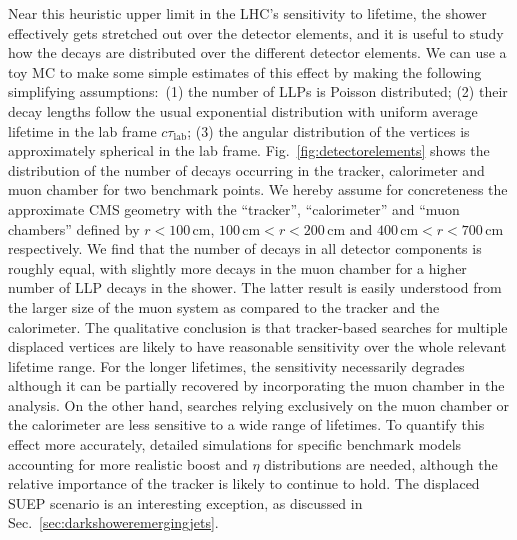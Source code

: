 Near this heuristic upper limit in the LHC's sensitivity to lifetime, the shower effectively gets stretched out over the detector elements, and it is useful to study how the decays are distributed over the different detector elements. We can use a toy MC to make some simple estimates of this effect by making the following simplifying assumptions:~(1) the number of LLPs is Poisson distributed; (2) their decay lengths follow the usual exponential distribution with uniform average lifetime in the lab frame $c\tau_{\text{lab}}$; (3) the angular distribution of the vertices is approximately spherical in the lab frame. Fig.~\ref{fig:detectorelements} shows the distribution of the number of decays occurring in the tracker, calorimeter and muon chamber for two benchmark points. We hereby assume for concreteness the approximate CMS geometry with the ``tracker'', ``calorimeter'' and ``muon chambers'' defined by $r<100\, \text{cm}$, $100\, \text{cm}<r<200\, \text{cm}$  and  $400\, \text{cm}<r<700\, \text{cm}$ respectively. We find that the number of decays in all detector components is roughly equal, with slightly more decays in the muon chamber for a higher number of LLP decays in the shower. The latter result is easily understood from the larger size of the muon system as compared to the tracker and the calorimeter. The qualitative conclusion is that tracker-based searches for multiple displaced vertices are likely to have reasonable sensitivity over the whole relevant lifetime range. For the longer lifetimes, the sensitivity necessarily degrades although it can be partially recovered by incorporating the muon chamber in the analysis. On the other hand, searches relying exclusively on the muon chamber or the calorimeter are less sensitive to a wide range of lifetimes. To quantify this effect more accurately, detailed simulations for specific benchmark models accounting for more realistic boost and $\eta$ distributions are needed, although the relative importance of the tracker is likely to continue to hold. The displaced SUEP scenario is an interesting exception, as discussed in Sec.~\ref{sec:darkshoweremergingjets}.

